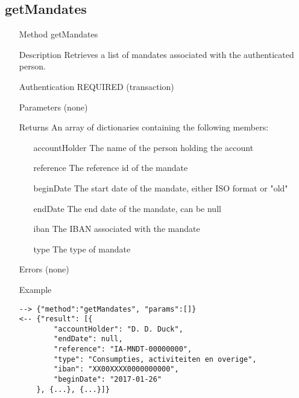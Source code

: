 \documentclass[a4paper]{scrreprt}
\begin{document}
\clearpage
\subsection{getMandates}
\begin{enumerate}
\item[Method] getMandates
\item[Description] Retrieves a list of mandates associated with the authenticated person.
\item[Authentication] REQUIRED (transaction)
\item[Parameters] (none)
\item[Returns] An array of dictionaries containing the following members:
\begin{enumerate}
    \item[accountHolder] The name of the person holding the account
    \item[reference] The reference id of the mandate
    \item[beginDate] The start date of the mandate, either ISO format or "old"
    \item[endDate] The end date of the mandate, can be null
    \item[iban] The IBAN associated with the mandate
    \item[type] The type of mandate
	\end{enumerate}
\item[Errors] (none)
\item[Example]
\begin{lstlisting}
--> {"method":"getMandates", "params":[]}
<-- {"result": [{
        "accountHolder": "D. D. Duck",
        "endDate": null,
        "reference": "IA-MNDT-00000000",
        "type": "Consumpties, activiteiten en overige",
        "iban": "XX00XXXX0000000000",
        "beginDate": "2017-01-26"
    }, {...}, {...}]}
\end{lstlisting}
\end{enumerate}


\clearpage
\end{document}
